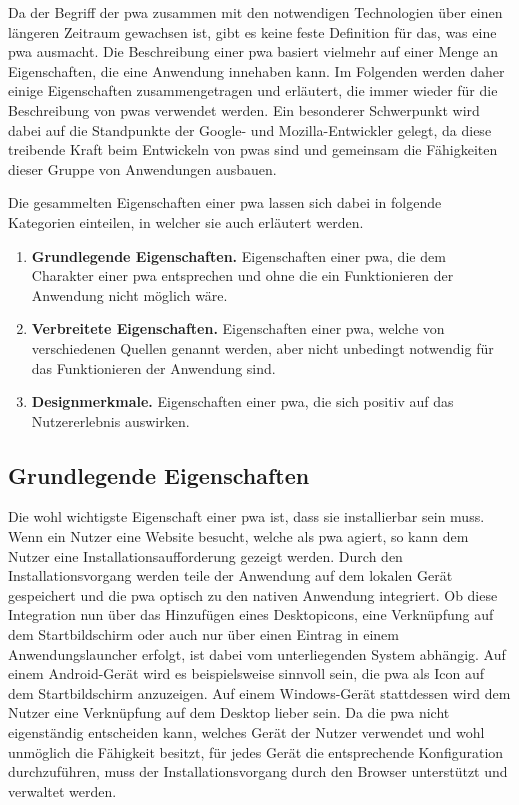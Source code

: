 \documentclass[12pt, parskip=half]{scrartcl}       %
\newcommand\litem[1]{\item{\bfseries#1.\space}}
\begin{document}
Da der Begriff der \ac{pwa} zusammen mit den notwendigen Technologien über einen längeren Zeitraum gewachsen ist, gibt es keine feste Definition für das, was eine \ac{pwa} ausmacht.
Die Beschreibung einer \ac{pwa} basiert vielmehr auf einer Menge an Eigenschaften, die eine Anwendung innehaben kann.
Im Folgenden werden daher einige Eigenschaften zusammengetragen und erläutert, die immer wieder für die Beschreibung von \acp{pwa} verwendet werden.
Ein besonderer Schwerpunkt wird dabei auf die Standpunkte der Google- und Mozilla-Entwickler gelegt, da diese treibende Kraft beim Entwickeln von \acp{pwa} sind und gemeinsam die Fähigkeiten dieser Gruppe von Anwendungen ausbauen.

Die gesammelten Eigenschaften einer \ac{pwa} lassen sich dabei in folgende Kategorien einteilen, in welcher sie auch erläutert werden.

\begin{enumerate}
  \litem{Grundlegende Eigenschaften} Eigenschaften einer \ac{pwa}, die dem Charakter einer \ac{pwa} entsprechen und ohne die ein Funktionieren der Anwendung nicht möglich wäre.

  \litem{Verbreitete Eigenschaften} Eigenschaften einer \ac{pwa}, welche von verschiedenen Quellen genannt werden, aber nicht unbedingt notwendig für das Funktionieren der Anwendung sind.

  \litem{Designmerkmale} Eigenschaften einer \ac{pwa}, die sich positiv auf das Nutzererlebnis auswirken.
\end{enumerate}


\subsection{Grundlegende Eigenschaften}

Die wohl wichtigste Eigenschaft einer \ac{pwa} ist, dass sie installierbar sein muss.
Wenn ein Nutzer eine Website besucht, welche als \ac{pwa} agiert, so kann dem Nutzer eine Installationsaufforderung gezeigt werden.
Durch den Installationsvorgang werden teile der Anwendung auf dem lokalen Gerät gespeichert und die \ac{pwa} optisch zu den nativen Anwendung integriert.
Ob diese Integration nun über das Hinzufügen eines Desktopicons, eine Verknüpfung auf dem Startbildschirm oder auch nur über einen Eintrag in einem Anwendungslauncher erfolgt, ist dabei vom unterliegenden System abhängig.
Auf einem Android-Gerät wird es beispielsweise sinnvoll sein, die \ac{pwa} als Icon auf dem Startbildschirm anzuzeigen.
Auf einem Windows-Gerät stattdessen wird dem Nutzer eine Verknüpfung auf dem Desktop lieber sein.
Da die \ac{pwa} nicht eigenständig entscheiden kann, welches Gerät der Nutzer verwendet und wohl unmöglich die Fähigkeit besitzt, für jedes Gerät die entsprechende Konfiguration durchzuführen, muss der Installationsvorgang durch den Browser unterstützt und verwaltet werden.
\end{document}

